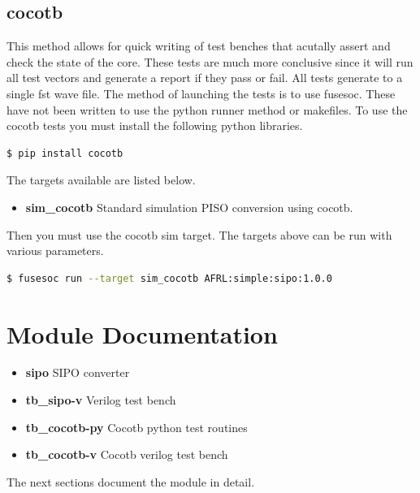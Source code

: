 \subsection{cocotb}
\par
This method allows for quick writing of test benches that acutally assert and check the state of the core.
These tests are much more conclusive since it will run all test vectors and generate a report if they
pass or fail. All tests generate to a single fst wave file. The method of launching the tests is to use
fusesoc. These have not been written to use the python runner method or makefiles.
To use the cocotb tests you must install the following python libraries.
\begin{lstlisting}[language=bash]
  $ pip install cocotb
\end{lstlisting}

The targets available are listed below.
\begin{itemize}
  \item \textbf{sim\_cocotb} Standard simulation PISO conversion using cocotb.
\end{itemize}

Then you must use the cocotb sim target. The targets above can be run with various parameters.
\begin{lstlisting}[language=bash]
  $ fusesoc run --target sim_cocotb AFRL:simple:sipo:1.0.0
\end{lstlisting}

\newpage

\section{Module Documentation} \label{Module Documentation}

\par

\begin{itemize}
\item \textbf{sipo} SIPO converter\\
\item \textbf{tb\_sipo-v} Verilog test bench\\
\item \textbf{tb\_cocotb-py} Cocotb python test routines\\
\item \textbf{tb\_cocotb-v} Cocotb verilog test bench\\
\end{itemize}
The next sections document the module in detail.

